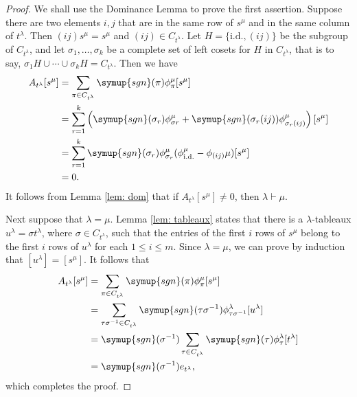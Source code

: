 \documentclass{assignment}[2019/10/15]
\newcommand{\lr}[3]{\left#1#3\right#2}
\theoremstyle{plain}
\newcommand{\sgn}{\mathop{}\!\symup{sgn}}
\newcommand{\id}{\text{i.d.}}
\begin{document}
    \begin{proof}
        We shall use the Dominance Lemma to prove the first assertion. Suppose there are two elements $i, j$ that are in the same row of $s^\mu$ and in the same column of $t^\lambda$. Then $(i j)s^\mu = s^\mu$ and $(i j)\in C_{t^\lambda}$. Let $H=\{\id, (i j)\}$ be the subgroup of $C_{t^\lambda}$, and let $\sigma_1, \dotsc, \sigma_k$ be a complete set of left cosets for $H$ in $C_{t^\lambda}$, that is to say, $\sigma_1H\cup\dotsb \cup \sigma_kH = C_{t^\lambda}$. Then we have
        \begin{equation}
            \begin{aligned}
                A_{t^\lambda}[s^\mu] &= \sum_{\pi\in C_{t^\lambda}}\sgn(\pi)\phi_\pi^\mu[s^\mu]\\
                &= \sum_{r=1}^k \lr(){\sgn(\sigma_r)\phi_{\sigma r}^\mu + \sgn(\sigma_r(i j))\phi_{\sigma_r(i j)}^\mu}[s^\mu]\\
                &= \sum_{r=1}^k\sgn(\sigma_r)\phi_{\sigma_r}^\mu(\phi_\id^\mu-\phi_{(i j)}\mu)[s^\mu]\\
                &= 0.
            \end{aligned}
        \end{equation}
        It follows from Lemma \ref{lem: dom} that if $A_{t^\lambda}[s^\mu]\neq 0$, then $\lambda\vdash\mu$.

        Next suppose that $\lambda=\mu$. Lemma \ref{lem: tableaux} states that there is a $\lambda$-tableaux $u^\lambda = \sigma t^\lambda$, where $\sigma\in C_{t^\lambda}$, such that the entries of the first $i$ rows of $s^\mu$ belong to the first $i$ rows of $u^\lambda$ for each $1\leq i\leq m$. Since $\lambda=\mu$, we can prove by induction that $[u^\lambda]=[s^\mu]$. It follows that
        \begin{equation}
            \begin{aligned}
                A_{t^\lambda}[s^\mu]
                &= \sum_{\pi\in C_{t^\lambda}}\sgn(\pi)\phi_\pi^\mu[s^\mu]\\
                &= \sum_{\tau\sigma^{-1}\in C_{t^\lambda}}\sgn(\tau\sigma^{-1})\phi_{\tau\sigma^{-1}}^\lambda[u^\lambda]\\
                &= \sgn(\sigma^{-1})\sum_{\tau\in C_{t^\lambda}}\sgn(\tau)\phi_\tau^\lambda[t^\lambda]\\
                &= \sgn(\sigma^{-1})e_{t^\lambda},
            \end{aligned}
        \end{equation}
        which completes the proof.
    \end{proof}
\end{document}
